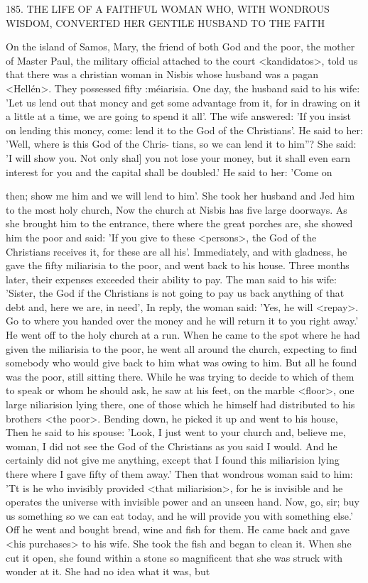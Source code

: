 185.
THE LIFE OF A FAITHFUL WOMAN WHO, WITH
WONDROUS WISDOM, CONVERTED HER GENTILE
HUSBAND TO THE FAITH

On the island of Samos, Mary, the friend of both God and the
poor, the mother of Master Paul, the military official attached to
the court <kandidatos>, told us that there was a christian woman
in Nisbis whose husband was a pagan <Hellén>.
They possessed
fifty :méiarisia.
One day, the husband said to his wife: 'Let us lend
out that moncy and get some advantage from it, for in drawing on
it a little at a time, we are going to spend it all'.
The wife answered:
'If you insist on lending this moncy, come: lend it to the God of the
Christians'.
He said to her: 'Well, where is this God of the Chris-
tians, so we can lend it to him”? She said: 'I will show you.
Not only
shal] you not lose your money, but it shall even earn interest for
you and the capital shall be doubled.' He said to her: 'Come on

then; show me him and we will lend to him'.
She took her husband
and Jed him to the most holy church, Now the church at Nisbis has
five large doorways.
As she brought him to the entrance, there
where the great porches are, she showed him the poor and said: 'If
you give to these <persons>, the God of the Christians receives it,
for these are all his'.
Immediately, and with gladness, he gave the
fifty miliarisia to the poor, and went back to his house.
Three
months later, their expenses exceeded their ability to pay.
The man
said to his wife: 'Sister, the God if the Christians is not going to pay
us back anything of that debt and, here we are, in need', In reply,
the woman said: 'Yes, he will <repay>.
Go to where you handed
over the money and he will return it to you right away.' He went off
to the holy church at a run.
When he came to the spot where he
had given the miliarisia to the poor, he went all around the church,
expecting to find somebody who would give back to him what was
owing to him.
But all he found was the poor, still sitting there.
While he was trying to decide to which of them to speak or whom
he should ask, he saw at his feet, on the marble <floor>, one large
niliarision lying there, one of those which he himself had distributed
to his brothers <the poor>.
Bending down, he picked it up and
went to his house, Then he said to his spouse: 'Look, I just went to
your church and, believe me, woman, I did not see the God of the
Christians as you said I would.
And he certainly did not give me
anything, except that I found this miliarision lying there where I
gave fifty of them away.' Then that wondrous woman said to him:
'Tt is he who invisibly provided <that miliarision>, for he is invisible
and he operates the universe with invisible power and an unseen
hand.
Now, go, sir; buy us something so we can eat today, and he
will provide you with something else.' Off he went and bought
bread, wine and fish for them.
He came back and gave <his
purchases> to his wife.
She took the fish and began to clean it.
When she cut it open, she found within a stone so magnificent that
she was struck with wonder at it.
She had no idea what it was, but


